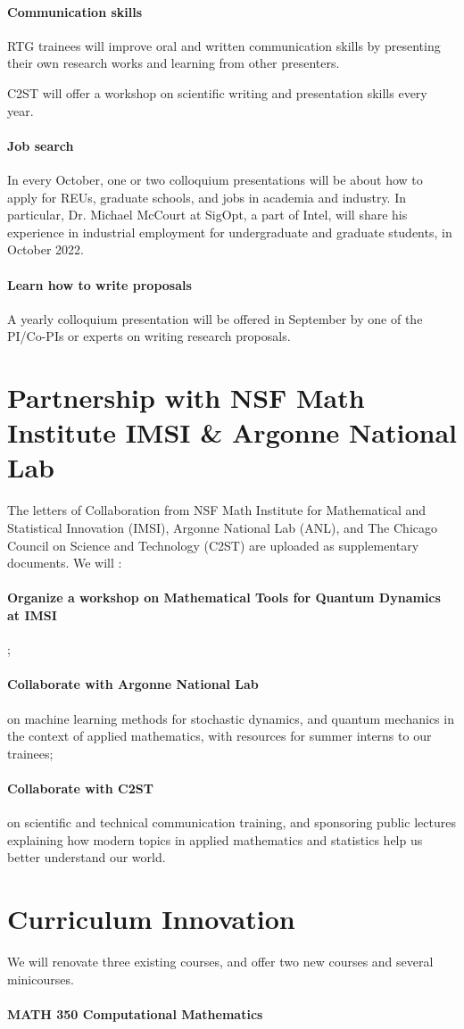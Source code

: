 \documentclass[11pt]{NSFamsart}
\newcommand{\bfparagraph}[1]{\paragraph{\textbf{\textup{#1}}}}
\begin{document}
\bfparagraph{Communication skills}
RTG trainees  will improve oral and written     communication skills by presenting their own research works and learning from other presenters.

C2ST will offer a workshop on scientific writing and presentation skills 
 every   year. 

\bfparagraph{Job search}
In every October, one or two colloquium presentations will be about how to apply for REUs, graduate schools, and   jobs   in academia and industry. 
In particular, Dr. Michael McCourt at SigOpt, a part of Intel, will share  his experience in industrial employment for undergraduate and graduate students, in October 2022. 

\bfparagraph{Learn how to write proposals}
A yearly colloquium presentation  will be offered in September by one of the PI/Co-PIs or experts on   writing research proposals. 


\section{Partnership with NSF Math Institute IMSI \& Argonne National Lab}

The letters of Collaboration from NSF Math Institute for Mathematical and Statistical Innovation (IMSI), Argonne National Lab (ANL), and 
The Chicago Council on Science and Technology (C2ST) are uploaded as supplementary documents.  We will :\\
\bfparagraph{Organize a workshop on Mathematical Tools for Quantum Dynamics   at IMSI};   
\bfparagraph{Collaborate with Argonne National Lab} on machine learning methods for stochastic dynamics, and quantum mechanics in the context of applied mathematics, with resources for summer interns to our trainees;  
\bfparagraph{Collaborate with C2ST} on scientific and technical communication training, and sponsoring public lectures explaining how modern topics in applied mathematics and statistics help us better understand our world.
 


\section{Curriculum Innovation}
We will renovate three existing courses,  
and offer two new courses and several minicourses.

\bfparagraph{MATH 350 Computational Mathematics} 
\end{document}
